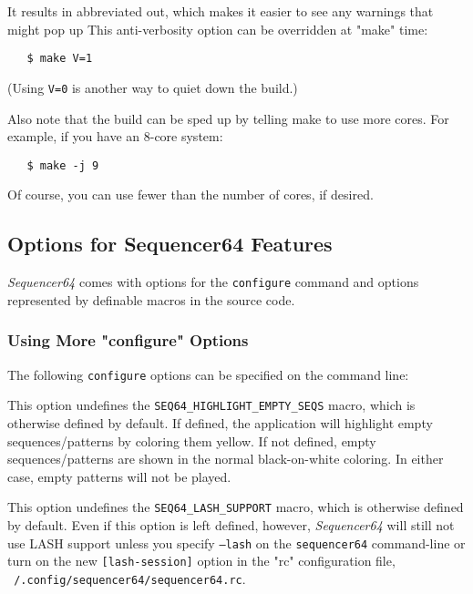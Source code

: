    It results in abbreviated out, which makes it easier to see
   any warnings that might pop up
   This anti-verbosity option can be overridden at "make" time:

\begin{verbatim}
   $ make V=1
\end{verbatim}

   (Using \texttt{V=0} is another way to quiet down the build.)

   Also note that the build can be sped up by telling make to use more cores.
   For example, if you have an 8-core system:

\begin{verbatim}
   $ make -j 9
\end{verbatim}

   Of course, you can use fewer than the number of cores, if desired.

\subsection{Options for Sequencer64 Features}
\label{subsec:seq64_build_options}

   \textsl{Sequencer64} comes with options for the \texttt{configure} command
   and options represented by definable macros in the source code.

\subsubsection{Using More "configure" Options}
\label{subsubsec:seq64_build_configure}

   The following \texttt{configure} options can be specified on the command
   line:

   \setcounter{ItemCounter}{0}      %

        This option undefines the \texttt{SEQ64\_HIGHLIGHT\_EMPTY\_SEQS}
        macro, which is otherwise defined by default.  If defined, the
        application will
        highlight empty sequences/patterns by coloring them yellow.
        If not defined, empty sequences/patterns are shown in the normal
        black-on-white coloring.  In either case, empty patterns will not be
        played.

        This option undefines the \texttt{SEQ64\_LASH\_SUPPORT} macro, which is
        otherwise defined by default.  Even if this option is left defined,
        however, \textsl{Sequencer64} will still not use LASH support unless
        you specify \texttt{--lash} on the \texttt{sequencer64} command-line or
        turn on the new \texttt{[lash-session]} option in the "rc"
        configuration file,
        \texttt{~/.config/sequencer64/sequencer64.rc}.

